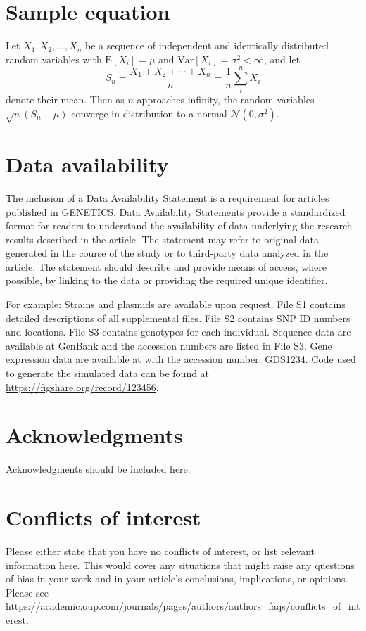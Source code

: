 {\begin{multicols}{2}
    \section{Sample equation}
    Let $X_1, X_2, \ldots, X_n$ be a sequence of independent and identically distributed random variables with $\text{E}[X_i] = \mu$ and $\text{Var}[X_i] = \sigma^2 < \infty$, and let
    \begin{equation}
    S_n = \frac{X_1 + X_2 + \cdots + X_n}{n}
          = \frac{1}{n}\sum_{i}^{n} X_i
    \label{eq:refname1}
    \end{equation}
    denote their mean. Then as $n$ approaches infinity, the random variables $\sqrt{n}(S_n - \mu)$ converge in distribution to a normal $\mathcal{N}(0, \sigma^2)$.
    
    \section{Data availability}
    The inclusion of a Data Availability Statement is a requirement for articles published in GENETICS. Data Availability Statements provide a standardized format for readers to understand the availability of data underlying the research results described in the article. The statement may refer to original data generated in the course of the study or to third-party data analyzed in the article. The statement should describe and provide means of access, where possible, by linking to the data or providing the required unique identifier.
    
    For example: Strains and plasmids are available upon request. File S1 contains detailed descriptions of all supplemental files. File S2 contains SNP ID numbers and locations. File S3 contains genotypes for each individual. Sequence data are available at GenBank and the accession numbers are listed in File S3. Gene expression data are available at \diteGEO with the accession number: GDS1234. Code used to generate the simulated data can be found at \url{https://figshare.org/record/123456}.
    
    \section{Acknowledgments}
    Acknowledgments should be included here.
    
    \section{Conflicts of interest}
    Please either state that you have no conflicts of interest, or \citep[pp.2-3]{Tewabe2021}list relevant information here.  This would cover any situations that might raise any questions of bias in your work and in your article’s conclusions, implications, or opinions. Please see \url{https://academic.oup.com/journals/pages/authors/authors_faqs/conflicts_of_interest}.
    
    
    
    \end{multicols}

}
\endinput